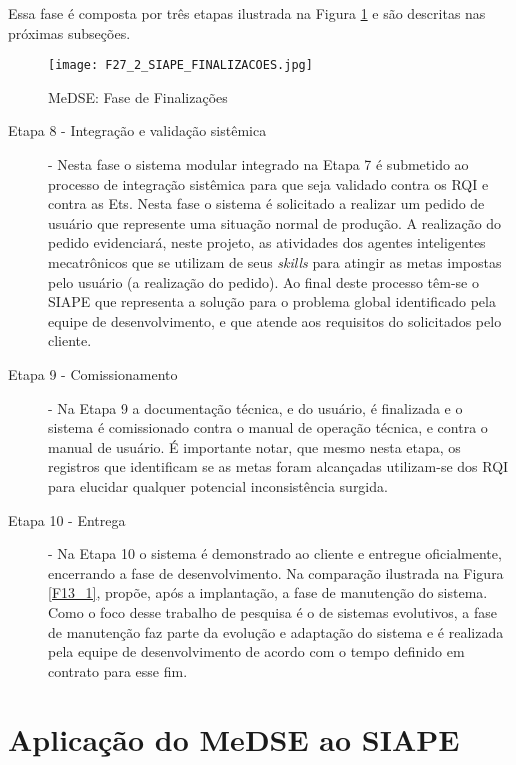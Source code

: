 Essa fase é composta por três etapas ilustrada na Figura \ref{F27_2} e são descritas nas próximas subseções.
 
\begin{figure}
	\centering
	\texttt{[image: F27\_2\_SIAPE\_FINALIZACOES.jpg]} 
	\caption{MeDSE: Fase de Finalizações}
	\label{F27_2}
\end{figure}
 
\begin{description}
 	
 	\item[Etapa 8 - Integração e validação sistêmica] - Nesta fase o sistema modular integrado na Etapa 7 é submetido ao processo de integração sistêmica para que seja validado contra os RQI e contra as Ets. Nesta fase o sistema é solicitado a realizar um pedido de usuário que represente uma situação normal de produção. A realização do pedido evidenciará, neste projeto, as atividades dos agentes inteligentes mecatrônicos que se utilizam de seus \textit{skills} para atingir as metas impostas pelo usuário (a realização do pedido). Ao final deste processo têm-se o SIAPE que representa a solução para o problema global identificado pela equipe de desenvolvimento, e que atende aos requisitos do solicitados pelo cliente. 
 	
 	\item[Etapa 9 - Comissionamento] - Na Etapa 9 a documentação técnica, e do usuário, é finalizada e o sistema é comissionado contra o manual de operação técnica, e contra o manual de usuário. É importante notar, que mesmo nesta etapa, os registros que identificam se as metas foram alcançadas utilizam-se dos RQI para elucidar qualquer potencial inconsistência surgida. 
 	
 	\item[Etapa 10 - Entrega] - Na Etapa 10 o sistema é demonstrado ao cliente e entregue oficialmente, encerrando a fase de desenvolvimento. Na comparação ilustrada na Figura \ref{F13_1},   propõe, após a implantação, a fase de manutenção do sistema. Como o foco desse trabalho de pesquisa é o de sistemas evolutivos, a fase de manutenção faz parte da evolução e adaptação do sistema e é realizada pela equipe de desenvolvimento de acordo com o tempo definido em contrato para esse fim.  
\end{description}
 	
 	
\cleardoublepage
\section{Aplicação do MeDSE ao SIAPE}

